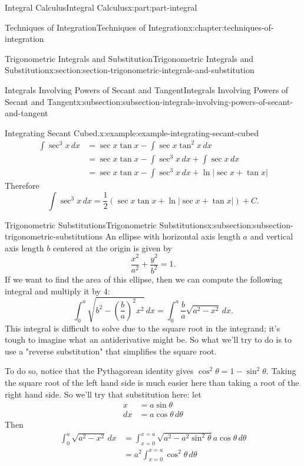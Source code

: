 \documentclass[twoside,10pt,]{tufte-book}
\numberwithin{equation}{part}
\begin{document}
\begin{partptx}{Integral Calculus}{}{Integral Calculus}{}{}{x:part:part-integral}
\begin{chapterptx}{Techniques of Integration}{}{Techniques of Integration}{}{}{x:chapter:techniques-of-integration}
\begin{sectionptx}{Trigonometric Integrals and Substitution}{}{Trigonometric Integrals and Substitution}{}{}{x:section:section-trigonometric-integrals-and-substitution}
\begin{subsectionptx}{Integrals Involving Powers of Secant and Tangent}{}{Integrals Involving Powers of Secant and Tangent}{}{}{x:subsection:subsection-integrals-involving-powers-of-secant-and-tangent}
\begin{example}{Integrating Secant Cubed.}{x:example:example-integrating-secant-cubed}
\begin{align*}
\int\sec^{3}x\,dx & = \sec x\tan x - \int \sec x\tan^{2}x\,dx \\
& = \sec x\tan x - \int\sec^{3}x\,dx + \int\sec x\,dx \\
& = \sec x\tan x - \int\sec^{3}x\,dx + \ln|\sec x + \tan x| 
\end{align*}
Therefore%
\begin{equation*}
\int\sec^{3}x\,dx = \frac{1}{2}(\sec x\tan x + \ln|\sec x + \tan x|) + C.
\end{equation*}
%
\end{example}
\end{subsectionptx}
%
%
\typeout{************************************************}
\typeout{************************************************}
%
\begin{subsectionptx}{Trigonometric Substitutions}{}{Trigonometric Substitutions}{}{}{x:subsection:subsection-trigonometric-substitutions}
An ellipse with horizontal axis length \(a\) and vertical axis length \(b\) centered at the origin is given by%
\begin{equation*}
\frac{x^{2}}{a^{2}} + \frac{y^{2}}{b^{2}} = 1.
\end{equation*}
If we want to find the area of this ellipse, then we can compute the following integral and multiply it by \(4\):%
\begin{equation*}
\int_{0}^{a}\sqrt{b^{2} - (\frac{b}{a})^{2}x^{2}}\,dx = \int_{0}^{a}\frac{b}{a}\sqrt{a^{2} - x^{2}}\,dx.
\end{equation*}
This integral is difficult to solve due to the square root in the integrand; it's tough to imagine what an antiderivative might be. So what we'll try to do is to use a "reverse substitution" that simplifies the square root.%
\par
To do so, notice that the Pythagorean identity gives \(\cos^{2}\theta = 1 - \sin^{2}\theta\). Taking the square root of the left hand side is much easier here than taking a root of the right hand side. So we'll try that substitution here: let%
\begin{align*}
x & = a\sin\theta \\
dx & = a\cos\theta\,d\theta 
\end{align*}
Then%
\begin{align*}
\int_{0}^{a}\sqrt{a^{2} - x^{2}}\,dx & = \int_{x = 0}^{x = a}\sqrt{a^{2} - a^{2}\sin^{2}\theta}a\cos\theta\,d\theta \\
& = a^{2}\int_{x = 0}^{x = a}\cos^{2}\theta\,d\theta 

\end{align*}
\end{subsectionptx}
\end{sectionptx}
\end{chapterptx}
\end{partptx}
\end{document}
